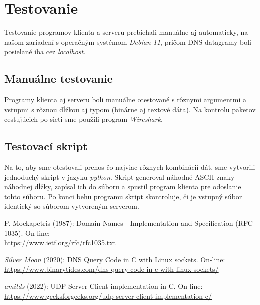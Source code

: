 \documentclass[a4paper]{article}
\begin{document}
  \section{Testovanie}

  Testovanie programov klienta a serveru prebiehali manuálne aj automaticky,
  na našom zariadení s operačným systémom \textit{Debian 11}, pričom DNS
  datagramy boli posielané iba cez \textit{localhost}.


  \subsection{Manuálne testovanie}

  Programy klienta aj serveru boli manuálne otestované s rôznymi argumentmi a 
  vstupmi s rôznou dĺžkou aj typom (binárne aj textové dáta). Na kontrolu
  paketov cestujúcich po sieti sme použili program \textit{Wireshark}.


  \subsection{Testovací skript}

  Na to, aby sme otestovali prenos čo najviac rôznych kombinácií dát, sme
  vytvorili jednoduchý skript v jazyku \textit{python}. Skript generoval
  náhodné ASCII znaky náhodnej dĺžky, zapísal ich do súboru a spustil program
  klienta pre odoslanie tohto súboru. Po konci behu programu skript
  skontroluje, či je vstupný súbor identický so súborom vytvoreným serverom.



  \begin{thebibliography}{1}

     P. Mockapetris (1987): Domain Names - Implementation and
      Specification (RFC 1035). On-line: \\
      \href{https://www.ietf.org/rfc/rfc1035.txt}{https://www.ietf.org/rfc/rfc1035.txt}

     \textit{Silver Moon} (2020): DNS Query Code in C with Linux
      sockets. On-line: \\
      \href{https://www.binarytides.com/dns-query-code-in-c-with-linux-sockets/}{https://www.binarytides.com/dns-query-code-in-c-with-linux-sockets/}

     \textit{amitds} (2022): UDP Server-Client
      implementation in C. On-line: \\
      \href{https://www.geeksforgeeks.org/udp-server-client-implementation-c/}{https://www.geeksforgeeks.org/udp-server-client-implementation-c/}

  \end{thebibliography}
\end{document}
